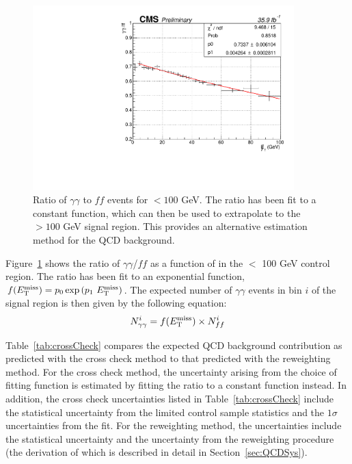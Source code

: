 \begin{figure}[h]
\begin{center}
\includegraphics[width=0.9\textwidth]{Figures/DataAnalysis/crossCheckFit.pdf}
\end{center}
\caption[Ratio of $\gamma\gamma$ to $ff$ events for \ETmiss$ < 100$ GeV.]
{Ratio of $\gamma\gamma$ to $ff$ events for \ETmiss$ < 100$ GeV. 
The ratio has been fit to a constant function, which can then be used to 
extrapolate to the \ETmiss$ >100$ GeV signal region. 
This provides an alternative estimation method for the QCD background.}
\label{fig:crossCheck}
\end{figure}

Figure~\ref{fig:crossCheck} shows the ratio of $\gamma\gamma$/$ff$ as a function of \ETmiss in the \ETmiss $<$ 100 GeV control region. The ratio has been fit to an exponential function, $f(E_{\mathrm{T}}^{\text{miss}}) = p_0\exp{(p_1~\ensuremath{E_{\mathrm{T}}^{\text{miss}}})}$. The expected number of $\gamma\gamma$ events in bin $i$ of the signal region is then given by the following equation:
\begin{equation}
N_{\gamma\gamma}^i = f(E_{\mathrm{T}}^{\text{miss}}) \times N_{ff}^i 
\end{equation}

Table~\ref{tab:crossCheck} compares the expected QCD background contribution as predicted with the cross check method to that predicted with the \diempt reweighting method. For the cross check method, the uncertainty arising from the choice of fitting function is estimated by fitting the ratio to a constant function instead. In addition, the cross check uncertainties listed in Table~\ref{tab:crossCheck} include the statistical uncertainty from the limited control sample statistics and the $1\sigma$ uncertainties from the fit. For the \diempt reweighting method, the uncertainties include the statistical uncertainty and the uncertainty from the \diempt reweighting procedure (the derivation of which is described in detail in Section~\ref{sec:QCDSys}). 

